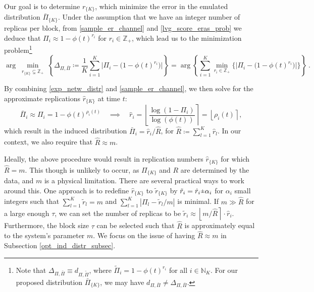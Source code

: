 \documentclass[journal,letterpaper,onecolumn,twoside,nofonttune]{IEEEtran}
\newcommand{\N}{\mathbb{N}}
\newcommand{\Z}{\mathbb{Z}}
\newcommand{\rpm}{\raisebox{.2ex}{$\scriptstyle\pm$}}
\newcommand{\Rh}{\hat{R}}
\newcommand{\rh}{\hat{r}}
\newcommand{\rt}{\tilde{r}}
\newcommand{\Pib}{\bar{\Pi}}
\newcommand{\Pit}{\tilde{\Pi}}
\begin{document}
Our goal is to determine $r_{\{K\}}$, which minimize the error in the emulated distribution $\Pib_{\{K\}}$. Under the assumption that we have an integer number of replicas per block, from \eqref{sample_er_channel} and \eqref{lvg_score_eras_prob} we deduce that $\Pi_i\approx1-\phi(t)^{r_i}$ for $r_i\in\Z_+$, which lead us to the minimization problem\footnote{Note that $\Delta_{\Pi,\Pib}\equiv d_{\Pi,\Pit}$, where $\Pit_{i}=1-\phi(t)^{r_i}$ for all $i\in\N_K$. For our proposed distribution $\Pib_{\{K\}}$, we may have $d_{\Pi,\Pib}\neq\Delta_{\Pi,\Pib}$.}
\begin{equation}
\label{appr_opt_sol}
  \arg\min_{\substack{r_{\{K\}}\subsetneq\Z_+}} \left\{\Delta_{\Pi,\Pib}\coloneqq\frac{1}{K}\sum_{i=1}^K\big|\Pi_i-\big(1-\phi(t)^{r_i}\big)\big|\right\} = \arg\left\{ \sum_{i=1}^K\min_{r_i\in\Z_+} \Big\{\big|\Pi_i-\big(1-\phi(t)^{r_i}\big)\big|\Big\} \right\}\ .
\end{equation}

By combining \eqref{exp_netw_distr} and \eqref{sample_er_channel}, we then solve for the approximate replications $\rh_{\{K\}}$ at time $t$:
\begin{equation}
\label{appr_distr}
  \Pib_i\approx\Pi_i=1-\phi(t)^{\rho_i(t)} \quad \implies \quad \rh_i=\left\lfloor\frac{\log(1-\Pi_i)}{\log(\phi(t))}\right\rceil=\left\lfloor\rho_i(t)\right\rceil,
\end{equation}
which result in the induced distribution $\Pib_i=\rh_i/\Rh$, for $\Rh\coloneqq\sum_{l=1}^K\rh_l$. In our context, we also require that $\Rh\approx m$.

Ideally, the above procedure would result in replication numbers $\rh_{\{K\}}$ for which $\Rh=m$. This though is unlikely to occur, as $\Pi_{\{K\}}$ and $R$ are determined by the data, and $m$ is a physical limitation. There are several practical ways to work around this. One approach is to redefine $\rh_{\{K\}}$ to $\rt_{\{K\}}$ by $\rt_i=\rh_i\rpm\alpha_i$ for $\alpha_i$ small integers such that $\sum_{l=1}^K\rt_l=m$ and $\sum_{l=1}^K|\Pi_l-\rt_l/m|$ is minimal. If $m\gg \Rh$ for a large enough $\tau$, we can set the number of replicas to be $\rt_i\approx\left\lfloor m/\Rh\right\rceil\cdot \rh_i$. Furthermore, the block size $\tau$ can be selected such that $\Rh$ is approximately equal to the system's parameter $m$. We focus on the issue of having $\Rh\approx m$ in Subsection \ref{opt_ind_distr_subsec}.
\end{document}

